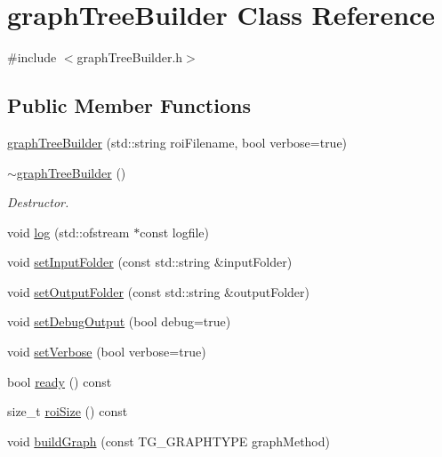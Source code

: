 \hypertarget{classgraphTreeBuilder}{\section{graph\-Tree\-Builder \-Class \-Reference}
\label{classgraphTreeBuilder}
}


{\ttfamily \#include $<$graph\-Tree\-Builder.\-h$>$}

\subsection*{\-Public \-Member \-Functions}
\begin{DoxyCompactItemize}
\item 
\hyperlink{classgraphTreeBuilder_a2b8a0bebe83d79b2517532867561ddc4}{graph\-Tree\-Builder} (std\-::string roi\-Filename, bool verbose=true)
\item 
\hypertarget{classgraphTreeBuilder_a74acaeeee3e79fccc564e4a1d05e7d8e}{\hyperlink{classgraphTreeBuilder_a74acaeeee3e79fccc564e4a1d05e7d8e}{$\sim$graph\-Tree\-Builder} ()}\label{classgraphTreeBuilder_a74acaeeee3e79fccc564e4a1d05e7d8e}

\begin{DoxyCompactList}\small\item\em \-Destructor. \end{DoxyCompactList}\item 
void \hyperlink{classgraphTreeBuilder_ab6ca8385e08fff92e2950fcb3eb8cf23}{log} (std\-::ofstream $\ast$const logfile)
\item 
void \hyperlink{classgraphTreeBuilder_a24d65d7b93d3aafc4e46eb7ecf42e682}{set\-Input\-Folder} (const std\-::string \&input\-Folder)
\item 
void \hyperlink{classgraphTreeBuilder_a6f847e452aa22bb02f32c819fe514963}{set\-Output\-Folder} (const std\-::string \&output\-Folder)
\item 
void \hyperlink{classgraphTreeBuilder_ada2a5011ebfb486347a4d889ba836f95}{set\-Debug\-Output} (bool debug=true)
\item 
void \hyperlink{classgraphTreeBuilder_a3af01d8c3ac8d6aa185db427bc7a51f1}{set\-Verbose} (bool verbose=true)
\item 
bool \hyperlink{classgraphTreeBuilder_a4db74b061d7078e65d439997eb38ebdb}{ready} () const 
\item 
size\-\_\-t \hyperlink{classgraphTreeBuilder_a865d192229372a52b8dd2b009e56c406}{roi\-Size} () const 
\item 
void \hyperlink{classgraphTreeBuilder_a3081e1dad8a76051d8453c498e21e09f}{build\-Graph} (const \-T\-G\-\_\-\-G\-R\-A\-P\-H\-T\-Y\-P\-E graph\-Method)
\end{DoxyCompactItemize}


